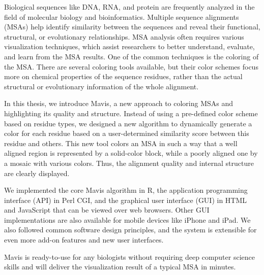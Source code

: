 Biological sequences like DNA, RNA, and protein are frequently analyzed in the field of molecular biology and bioinformatics. Multiple sequence alignments (MSAs) help identify similarity between the sequences and reveal their functional, structural, or evolutionary relationships. MSA analysis often requires various visualization techniques, which assist researchers to better understand, evaluate, and learn from the MSA results. One of the common techniques is the coloring of the MSA. There are several coloring tools available, but their color schemes focus more on chemical properties of the sequence residues, rather than the actual structural or evolutionary information of the whole alignment.

In this thesis, we introduce Mavis, a new approach to coloring MSAs and highlighting its quality and structure. Instead of using a pre-defined color scheme based on residue types, we designed a new algorithm to dynamically generate a color for each residue based on a user-determined similarity score between this residue and others. This new tool colors an MSA in such a way that a well aligned region is represented by a solid-color block, while a poorly aligned one by a mosaic with various colors. Thus, the alignment quality and internal structure are clearly displayed.

We implemented the core Mavis algorithm in R, the application programming interface (API) in Perl CGI, and the graphical user interface (GUI) in HTML and JavaScript that can be viewed over web browsers. Other GUI implementations are also available for mobile devices like iPhone and iPad. We also followed common software design principles, and the system is extensible for even more add-on features and new user interfaces.

Mavis is ready-to-use for any biologists without requiring deep computer science skills and will deliver the visualization result of a typical MSA in minutes.